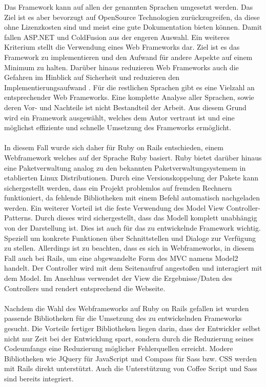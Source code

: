 Das Framework kann auf allen der genannten Sprachen umgesetzt werden.
Das Ziel ist es aber bevorzugt auf OpenSource Technologien zurückzugreifen, da diese ohne Lizenzkosten sind und meist eine gute Dokumentation bieten können. Damit fallen ASP.NET und ColdFusion aus der engeren Auswahl. Ein weiteres Kriterium stellt die Verwendung eines Web Frameworks dar. Ziel ist es das Framework zu implementieren und den Aufwand für andere Aspekte auf einem Minimum zu halten. Darüber hinaus reduzieren Web Frameworks auch die Gefahren im Hinblick auf Sicherheit \cite{Livshits.2007} und reduzieren den Implementierungsaufwand \cite{Schwabe.2001}. Für die restlichen Sprachen gibt es eine Vielzahl an entsprechender Web Frameworks.\cite{Weinberger.2011} Eine komplette Analyse aller Sprachen, sowie deren Vor- und Nachteile ist nicht Bestandteil der Arbeit. Aus diesem Grund wird ein Framework ausgewählt, welches dem Autor vertraut ist und eine möglichst effiziente und schnelle Umsetzung des Frameworks ermöglicht.
\\\\
In diesem Fall wurde sich daher für \glqq Ruby on Rails\grqq{} entschieden, einem Webframework welches auf der Sprache Ruby basiert. Ruby bietet darüber hinaus eine Paketverwaltung analog zu den bekannten Paketverwaltungsystemem in etablierten Linux Distributionen.\cite{Bachle.2007} Durch eine Versionskoppelung der Pakete kann sichergestellt werden, dass ein Projekt problemlos auf fremden Rechnern funktioniert, da fehlende Bibliotheken mit einem Befehl automatisch nachgeladen werden.
Ein weiterer Vorteil ist die feste Verwendung des Model View Controller-Patterns.\cite{Tate.2006} Durch dieses wird sichergestellt, dass das Modell komplett unabhängig von der Darstellung ist. Dies ist auch für das zu entwickelnde Framework wichtig. Speziell um konkrete Funktionen über Schnittstellen  und Dialoge zur Verfügung zu stellen. Allerdings ist zu beachten, dass es sich in Webframeworks, in diesem Fall auch bei Rails, um eine abgewandelte Form des MVC namens Model2 handelt.\cite{Qiuhui.2002} Der Controller wird mit dem Seitenaufruf angestoßen und interagiert mit dem Model. Im Anschluss verwendet der View die Ergebnisse/Daten des Controllers und rendert entsprechend die Webseite.
\\\\
Nachdem die Wahl des Webframeworks auf Ruby on Rails gefallen ist wurden passende Bibliotheken für die Umsetzung des zu entwickelnden Frameworks gesucht. 
Die Vorteile fertiger Bibliotheken liegen darin, dass der Entwickler selbst nicht nur Zeit bei der Entwicklung spart, sondern durch die Reduzierung seines Codeumfangs eine Reduzierung möglicher Fehlerquellen erreicht.
Modere Bibliotheken wie JQuery für JavaScript und Compass für Sass bzw. CSS werden mit Rails direkt unterstützt. Auch die Unterstützung von Coffee Script und Sass sind bereits integriert.

